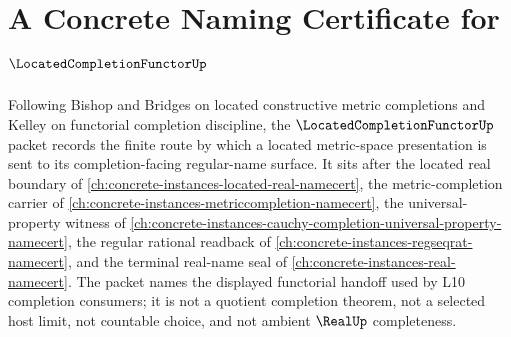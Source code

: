 \chapter{A Concrete Naming Certificate for $\LocatedCompletionFunctorUp$}
\label{ch:concrete-instances-located-completion-functor-namecert}

Following Bishop and Bridges on located constructive metric completions and Kelley on functorial completion discipline, the $\LocatedCompletionFunctorUp$ packet records the finite route by which a located metric-space presentation is sent to its completion-facing regular-name surface. It sits after the located real boundary of \autoref{ch:concrete-instances-located-real-namecert}, the metric-completion carrier of \autoref{ch:concrete-instances-metriccompletion-namecert}, the universal-property witness of \autoref{ch:concrete-instances-cauchy-completion-universal-property-namecert}, the regular rational readback of \autoref{ch:concrete-instances-regseqrat-namecert}, and the terminal real-name seal of \autoref{ch:concrete-instances-real-namecert}. The packet names the displayed functorial handoff used by L10 completion consumers; it is not a quotient completion theorem, not a selected host limit, not countable choice, and not ambient $\RealUp$ completeness.

